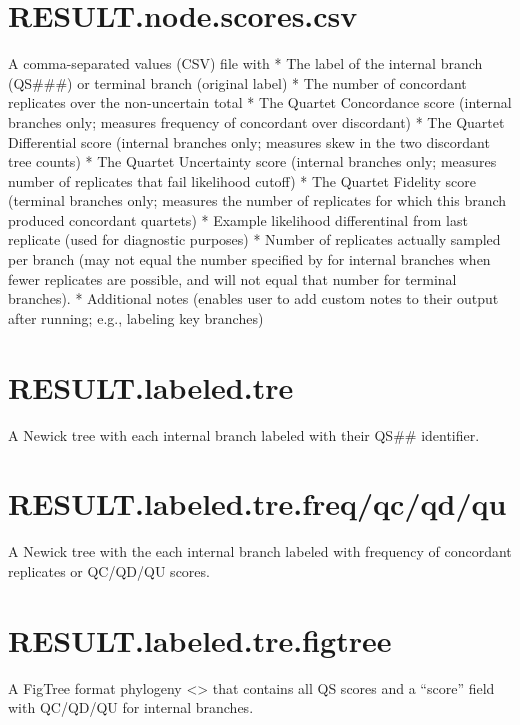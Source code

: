 \documentclass[letterpaper,12pt,english]{sphinxmanual}
\begin{document}
\section{RESULT.node.scores.csv}
\label{\detokenize{output:result-node-scores-csv}}
A comma-separated values (CSV) file with
*  The label of the internal branch (QS\#\#\#) or terminal branch (original label)
*  The number of concordant replicates over the non-uncertain total
*  The Quartet Concordance score (internal branches only; measures frequency of concordant over discordant)
*  The Quartet Differential score (internal branches only; measures skew in the two discordant tree counts)
*  The Quartet Uncertainty score (internal branches only; measures number of replicates that fail likelihood cutoff)
*  The Quartet Fidelity score (terminal branches only; measures the number of replicates for which this branch produced concordant quartets)
*  Example likelihood differentinal from last replicate (used for diagnostic purposes)
*  Number of replicates actually sampled per branch (may not equal the number specified by  for internal branches when fewer replicates are possible, and will not equal that number for terminal branches).
*  Additional notes (enables user to add custom notes to their output after running; e.g., labeling key branches)


\section{RESULT.labeled.tre}
\label{\detokenize{output:result-labeled-tre}}
A Newick tree with each internal branch labeled with their QS\#\# identifier.


\section{RESULT.labeled.tre.freq/qc/qd/qu}
\label{\detokenize{output:result-labeled-tre-freq-qc-qd-qu}}
A Newick tree with the each internal branch labeled with frequency of concordant replicates or QC/QD/QU scores.


\section{RESULT.labeled.tre.figtree}
\label{\detokenize{output:result-labeled-tre-figtree}}
A FigTree format phylogeny \textless{}\textgreater{} that contains all QS scores and a “score” field with QC/QD/QU for internal branches.
\end{document}
